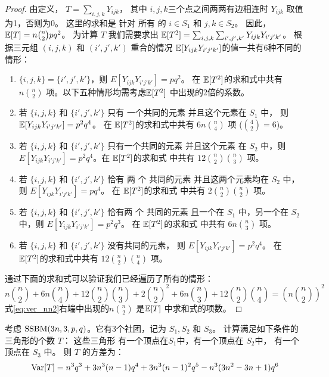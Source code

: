 \begin{proof}
	由定义， $T=\sum_{i,j,k} Y_{ijk}$，
  其中 $i,j,k$三个点之间两两有边相连时 $Y_{ijk}$ 取值为1，否则为0。
  这里的求和是
  针对 所有 的 $i \in S_1$ 和 $j,k \in S_2$。
  因此， $\operatorname{\mathbb{E}}[T] = n\binom{n}{2}pq^2$。
	为计算 $T$ 我们需要求出 $\operatorname{\mathbb{E}}[T^2] = \sum_{i,j,k}\sum_{i',j',k'} Y_{ijk}Y_{i'j'k'}$。
	根据三元组 $(i,j,k)$ 和 $(i',j',k')$ 重合的情况
  $\operatorname{\mathbb{E}}[Y_{ijk}Y_{i'j'k'}]$的值一共有6种不同的情形：
	\begin{enumerate}
		\item $\{i,j,k\} = \{i',j',k'\}$，则 $E[Y_{ijk}Y_{i'j'k'}] = pq^2$。
		在 $\operatorname{\mathbb{E}}[T^2]$的求和式中共有 $n\binom{n}{2}$ 
     项。以下五种情形均需考虑$\operatorname{\mathbb{E}}[T^2]$ 中出现的2倍的系数。
		\item 若 $\{i,j,k\}$ 和 $\{i',j',k'\}$ 只有
    一个共同的元素
    并且这个元素在 $ S_1$ 中， 则 $\operatorname{\mathbb{E}}[Y_{ijk}Y_{i'j'k'}] = p^2q^4$。
		在 $\operatorname{\mathbb{E}}[T^2]$的求和式中共有 $6n\binom{n}{4}$ 项 ($\binom{4}{2}=6$)。
		\item 若 $\{i,j,k\}$ 和 $\{i',j',k'\}$ 只有一个共同的元素
    并且这个元素 在 $ S_2$ 中，则
    $E[Y_{ijk}Y_{i'j'k'}] = p^2q^4$。在 $\operatorname{\mathbb{E}}[T^2]$的求和式
		中共有 $12\binom{n}{2}\binom{n}{3}$ 项。
		\item 若 $\{i,j,k\}$ 和 $\{i',j',k'\}$ 恰有 两  个 共同的元素
    并且这两个元素均在 $S_2$ 中，
    则 $E[Y_{ijk}Y_{i'j'k'}] = pq^4$。
    在 $\operatorname{\mathbb{E}}[T^2]$的求和式
		中共有  $2\binom{n}{2}\binom{n}{2}$ 项。
\item 若 $\{i,j,k\}$ 和 $\{i',j',k'\}$ 恰有两  个 共同的元素
且一个在 $S_1$ 中，另一个在 $S_2$ 中，则 $E[Y_{ijk}Y_{i'j'k'}] = p^2q^3$。
在 $\operatorname{\mathbb{E}}[T^2]$的求和式
		中共有 $6n\binom{n}{3}$ 项。
\item  若 $\{i,j,k\}$ 和 $\{i',j',k'\}$ 没有共同的元素，
 则 $E[Y_{ijk}Y_{i'j'k'}] = p^2q^4$。
 在 $\operatorname{\mathbb{E}}[T^2]$的求和式中共有 $12\binom{n}{2}\binom{n}{4}$ 
 项。
	\end{enumerate}
通过下面的求和式可以验证我们已经遍历了所有的情形：
\begin{equation}\label{eq:ver_nn2}
  n\binom{n}{2} + 6n\binom{n}{4} + 12\binom{n}{2} \binom{n}{3} + 2\binom{n}{2}^2 + 6n\binom{n}{3} + 12\binom{n}{2}\binom{n}{4} = \left(n\binom{n}{2}\right)^2  
\end{equation}
式\eqref{eq:ver_nn2}右端中出现的$n\binom{n}{2}$ 是$\operatorname{\mathbb{E}}[T] $ 中求和式的项数。
\end{proof}
\begin{lemma}\label{lem:SBM_tr_counting_3}
	考虑 $\operatorname{SSBM}(3n, 3, p, q)$。它有3个社团，记为
  $S_1,S_2$ 和 $S_3$。
  计算满足如下条件的三角形的个数 $T$：
  这些三角形 有一个顶点在$S_1$中，有一个顶点在 $S_2$中，
  有一个顶点在 $S_3$ 中。
	则 $T$ 的方差为：
	\begin{equation*}\label{eq:SBM_tr_counting_three}
	\operatorname{\mathrm{Var}}[T] = n^3 q^3  + 3n^3(n-1) q^4  + 3 n^3 (n-1)^2 q^5 - n^3(3n^2-3n+1)q^6
	\end{equation*}
\end{lemma}


